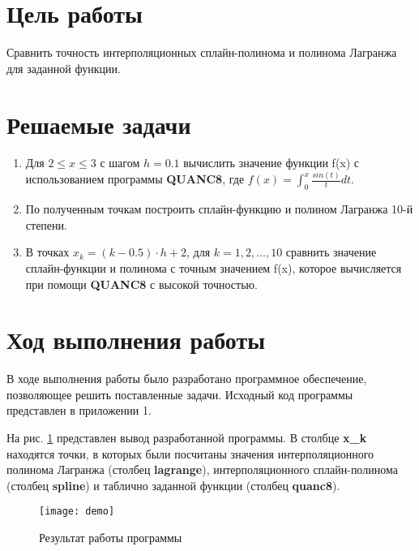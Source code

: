 




\section{Цель работы}
Сравнить точность интерполяционных сплайн-полинома и полинома Лагранжа для заданной функции.

\section{Решаемые задачи}
\begin{enumerate}

\item Для $2 \leq x \leq 3$ с шагом $h = 0.1$ вычислить значение функции f(x) с использованием программы \textbf{QUANC8}, где $f(x) = \int_{0}^{x} \frac{sin(t)}{t} dt$.

\item По полученным точкам построить сплайн-функцию и полином Лагранжа 10-й степени.

\item  В точках $x_k = (k - 0.5) \cdot h + 2$, для $k = 1, 2, \dots, 10$ сравнить значение сплайн-функции и полинома с точным значением f(x), которое вычисляется при помощи \textbf{QUANC8} с высокой точностью.
\end{enumerate}


\section{Ход выполнения работы}

В ходе выполнения работы было разработано программное обеспечение, позволяющее решить поставленные задачи. Исходный код программы представлен в приложении 1.

 На рис. \ref{pic:demo} представлен вывод разработанной программы. В столбце \textbf{x\_k} находятся точки, в которых были посчитаны значения интерполяционного полинома Лагранжа (столбец \textbf{lagrange}), интерполяционного сплайн-полинома (столбец \textbf{spline}) и таблично заданной функции (столбец \textbf{quanc8}).

\begin{figure}[H]
	\begin{center}
		\texttt{[image: demo]}
		\caption{Результат работы программы} 
		\label{pic:demo} %
	\end{center}
\end{figure}

